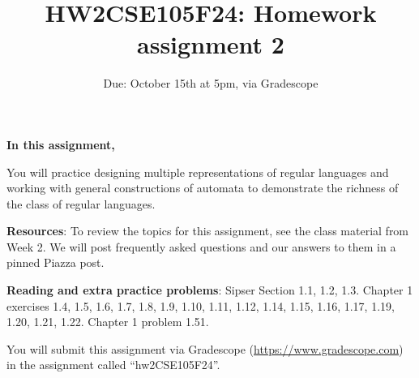 \begin{enumerate}[wide, labelwidth=!, labelindent=0pt]
\begin{enumerate}
    \end{enumerate}
    
    \end{enumerate}
\newpage

\title{HW2CSE105F24: Homework assignment 2}
\date{Due: October 15th at 5pm, via Gradescope}



\maketitle
\thispagestyle{fancy}

{\bf In this assignment,}

You will practice designing multiple representations of regular languages and working with 
general constructions of automata to demonstrate the richness of the class of regular languages.


{\bf Resources}: To review the topics 
for this assignment, see the class material from Week 2.
We will post frequently asked questions and our answers to them in a 
pinned Piazza post. 

{\bf Reading and extra practice problems}:  
Sipser Section 1.1, 1.2, 1.3. 
Chapter 1 exercises 1.4, 1.5, 1.6, 1.7, 1.8, 1.9, 1.10, 1.11, 1.12, 1.14, 1.15, 
1.16, 1.17, 1.19, 1.20, 1.21, 1.22. Chapter 1 problem 1.51.

\instructions

You will submit this assignment via Gradescope
(\href{https://www.gradescope.com}{https://www.gradescope.com}) 
in the assignment called ``hw2CSE105F24''.


